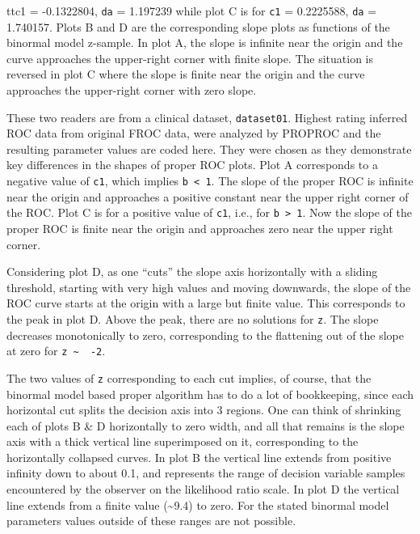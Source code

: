\documentclass[
]{book}
\begin{document}
tt{c1} = -0.1322804, \texttt{da} = 1.197239 while plot C is for \texttt{c1} = 0.2225588, \texttt{da} = 1.740157. Plots B and D are the corresponding slope plots as functions of the binormal model z-sample. In plot A, the slope is infinite near the origin and the curve approaches the upper-right corner with finite slope. The situation is reversed in plot C where the slope is finite near the origin and the curve approaches the upper-right corner with zero slope.

These two readers are from a clinical dataset, \texttt{dataset01}. Highest rating inferred ROC data from original FROC data, were analyzed by PROPROC and the resulting parameter values are coded here. They were chosen as they demonstrate key differences in the shapes of proper ROC plots. Plot A corresponds to a negative value of \texttt{c1}, which implies \texttt{b\ \textless{}\ 1}. The slope of the proper ROC is infinite near the origin and approaches a positive constant near the upper right corner of the ROC. Plot C is for a positive value of \texttt{c1}, i.e., for \texttt{b\ \textgreater{}\ 1}. Now the slope of the proper ROC is finite near the origin and approaches zero near the upper right corner.

Considering plot D, as one ``cuts'' the slope axis horizontally with a sliding threshold, starting with very high values and moving downwards, the slope of the ROC curve starts at the origin with a large but finite value. This corresponds to the peak in plot D. Above the peak, there are no solutions for \texttt{z}. The slope decreases monotonically to zero, corresponding to the flattening out of the slope at zero for \texttt{z\ \textasciitilde{}\ \ -2}.

The two values of \texttt{z} corresponding to each cut implies, of course, that the binormal model based proper algorithm has to do a lot of bookkeeping, since each horizontal cut splits the decision axis into 3 regions. One can think of shrinking each of plots B \& D horizontally to zero width, and all that remains is the slope axis with a thick vertical line superimposed on it, corresponding to the horizontally collapsed curves. In plot B the vertical line extends from positive infinity down to about 0.1, and represents the range of decision variable samples encountered by the observer on the likelihood ratio scale. In plot D the vertical line extends from a finite value (\textasciitilde9.4) to zero. For the stated binormal model parameters values outside of these ranges are not possible.
\end{document}
